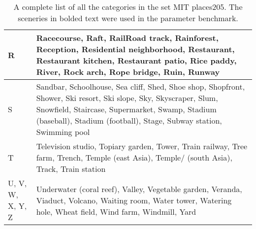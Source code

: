 \begin{table}[H]
\begin{scriptsize}
\begin{tabular}{|L{1.5cm} | L{13cm} |}
R & Racecourse, Raft, RailRoad track, Rainforest, Reception, Residential neighborhood, Restaurant, Restaurant kitchen, Restaurant patio, Rice paddy, River, Rock arch, Rope bridge, Ruin, Runway\\\hline
S & Sandbar, Schoolhouse, Sea cliff, Shed, Shoe shop, Shopfront, Shower, Ski resort, Ski slope, Sky, Skyscraper, Slum, Snowfield, Staircase, Supermarket, Swamp, Stadium (baseball), Stadium (football), Stage, Subway station, Swimming pool\\\hline
T & Television studio, Topiary garden, Tower, Train railway, Tree farm, Trench, Temple (east Asia), Temple/ (south Asia), Track, Train station\\\hline
U, V, W, X, Y, Z & Underwater (coral reef), Valley, Vegetable garden, Veranda, Viaduct, Volcano, Waiting room, Water tower, Watering hole, Wheat field, Wind farm, Windmill, Yard\\\hline

\end{tabular}
\end{scriptsize}
\caption{A complete list of all the categories in the set MIT places205. The sceneries in bolded text were used in the parameter benchmark.}
\label{table:appendix:dataset:places}
\end{table}